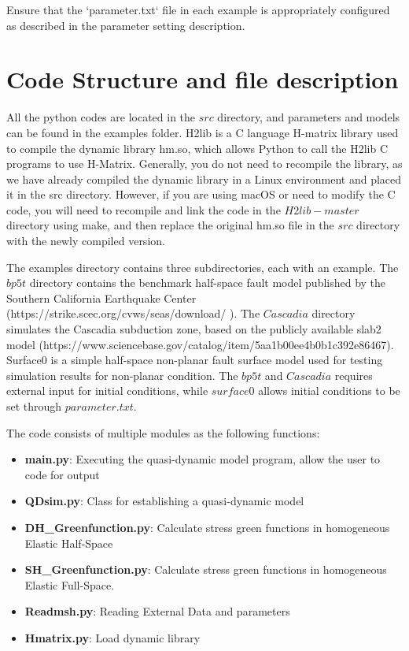 \documentclass[a4paper,12pt]{article}
\begin{document}
Ensure that the `parameter.txt` file in each example is appropriately configured as described in the parameter setting description.

\section{Code Structure and file description}
All the python codes are located in the $src$ directory, and parameters and models can be found in the examples folder. H2lib is a C language H-matrix library used to compile the dynamic library hm.so, which allows Python to call the H2lib C programs to use H-Matrix. Generally, you do not need to recompile the library, as we have already compiled the dynamic library in a Linux environment and placed it in the src directory. However, if you are using macOS or need to modify the C code, you will need to recompile and link the code in the $H2lib-master$ directory using make, and then replace the original hm.so file in the $src$ directory with the newly compiled version.

The examples directory contains three subdirectories, each with an example. The $bp5t$ directory contains the benchmark half-space fault model published by the Southern California Earthquake Center (https://strike.scec.org/cvws/seas/download/ ). The $Cascadia$ directory simulates the Cascadia subduction zone, based on the publicly available slab2 model (https://www.sciencebase.gov/catalog/item/5aa1b00ee4b0b1c392e86467). Surface0 is a simple half-space non-planar fault surface model used for testing simulation results for non-planar condition. The $bp5t$ and $Cascadia$ requires external input for initial conditions, while $surface0$ allows initial conditions to be set through $parameter.txt$.



The code consists of multiple modules as the following functions:
\begin{itemize}
    \item \textbf{main.py}: Executing the quasi-dynamic model program, allow the user to code for output
    \item \textbf{QDsim.py}: Class for establishing a quasi-dynamic model
    \item \textbf{DH\_Greenfunction.py}: Calculate stress green functions in homogeneous Elastic Half-Space
\item \textbf{SH\_Greenfunction.py}: Calculate stress green functions in homogeneous Elastic Full-Space.
\item \textbf{Readmsh.py}: Reading External Data and parameters
\item \textbf{Hmatrix.py}: Load dynamic library
\end{itemize}
\end{document}
